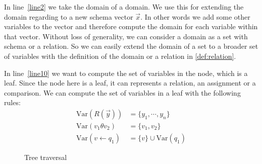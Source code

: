 \documentclass[12pt]{article}
\begin{document}
In line~\ref{line2} we take the domain of a domain. We use this for extending the domain regarding to a new schema vector $\vec x$. In other words we add some other variables to the vector and therefore compute the domain for each variable within that vector. Without loss of generality, we can consider a domain as a set with schema or a relation. So we can easily extend the domain of a set to a broader set of variables with the definition of the domain or a relation in \eqref{def:relation}. \\\par
In line~\ref{line10} we want to compute the set of variables in the node, which is a leaf. Since the node here is a leaf, it can represents a relation, an assignment or a comparison. We can compute the set of variables in a leaf with the following rules:
\begin{align}
\text{Var}(R(\vec{y}))&=\{y_{1},\cdots,y_{n}\}\\
\text{Var}(v_{1}\theta v_{2})&=\{v_{1},v_{2}\}\\
\text{Var}(v\gets q_{1})&=\{v\}\cup\text{Var}(q_{1})
\end{align}

\begin{figure}[htbp]
\begin{center}
\end{center}
\caption{Tree traversal}
\label{fig1}
\end{figure}
\end{document}

